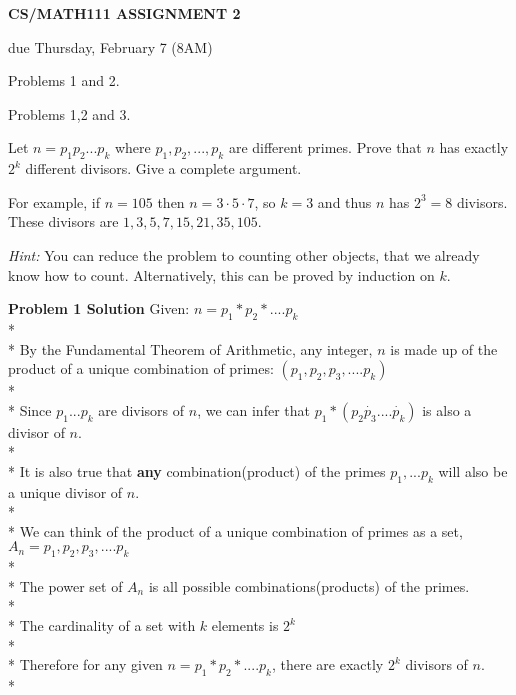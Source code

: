 \documentclass{article}
\begin{document}

\centerline{\large \bf CS/MATH111 ASSIGNMENT 2}
\centerline{due Thursday, February 7 (8AM)}

\vskip 0.1in
 Problems 1 and 2.

 Problems 1,2 and 3.

\vskip 0.1in


\begin{problem}
Let $n = p_1p_2...p_k$ where $p_1,p_2,...,p_k$ are different primes.	
Prove that $n$ has exactly $2^k$ different divisors. Give a complete argument.

For example, if $n =105$ then $n = 3\cdot 5 \cdot 7$, so $k=3$ and
thus $n$ has $2^3 = 8$ divisors. These divisors are $1,3,5,7,15,21,35,105$.

\emph{Hint:} You can reduce the problem to counting other objects, that we already
know how to count. Alternatively, this can be proved by induction on $k$.
\end{problem}

\textbf{Problem 1 Solution}
Given: $n = p_1*p_2*....p_k$
\\*\\*
By the Fundamental Theorem of Arithmetic, any integer, $n$ is made up of the product of a unique combination of primes: $(p_1, p_2, p_3,....p_k)$
\\*\\*
Since $p_1...p_k$ are divisors of $n$, we can infer that $p_1*(p_2\dot{p_3}....\dot{p_k})$ is also a divisor of $n$. 
\\*\\*
It is also true that \textbf{any} combination(product) of the primes $p_1,...p_k$ will also be a unique divisor of $n$.
\\*\\*
We can think of the product of a unique combination of primes as a set, $A_n = {p_1, p_2, p_3,....p_k}$
\\*\\*
The power set of $A_n$ is all possible combinations(products) of the primes.
\\*\\*
The cardinality of a set with $k$ elements is $2^k$
\\* \\*
Therefore for any given $n = p_1*p_2*....p_k$, there are exactly $2^k$ divisors of $n$.
\\*
\end{document}
